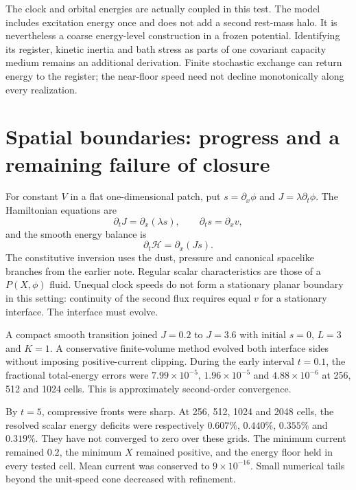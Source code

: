 \documentclass[11pt]{article}
\begin{document}
The clock and orbital energies are actually coupled in this test. The
model includes excitation energy once and does not add a second rest-mass
halo. It is nevertheless a coarse energy-level construction in a frozen
potential. Identifying its register, kinetic inertia and bath stress as
parts of one covariant capacity medium remains an additional derivation.
Finite stochastic exchange can return energy to the register; the
near-floor speed need not decline monotonically along every realization.

\section{Spatial boundaries: progress and a remaining failure of closure}
For constant $V$ in a flat one-dimensional patch, put
$s=\partial_x\phi$ and $J=\lambda\partial_t\phi$. The Hamiltonian equations are
\begin{equation}
 \partial_tJ=\partial_x(\lambda s),\qquad
 \partial_ts=\partial_xv,
\end{equation}
and the smooth energy balance is
\begin{equation}
 \partial_t\mathcal H=\partial_x(Js).
\end{equation}
The constitutive inversion uses the dust, pressure and canonical spacelike
branches from the earlier note. Regular scalar characteristics are those
of a $P(X,\phi)$ fluid\cite{Garriga}. Unequal clock speeds do not form a
stationary planar boundary in this setting: continuity of the second flux
requires equal $v$ for a stationary interface. The interface must evolve.

A compact smooth transition joined $J=0.2$ to $J=3.6$ with initial $s=0$,
$L=3$ and $K=1$. A conservative finite-volume method evolved both interface
sides without imposing positive-current clipping. During the early interval
$t=0.1$, the fractional total-energy errors were
$7.99\times10^{-5}$, $1.96\times10^{-5}$ and $4.88\times10^{-6}$ at
256, 512 and 1024 cells. This is approximately second-order convergence.

By $t=5$, compressive fronts were sharp. At 256, 512, 1024 and 2048 cells,
the resolved scalar energy deficits were respectively $0.607\%$, $0.440\%$,
$0.355\%$ and $0.319\%$. They have not converged to zero over these grids.
The minimum current remained $0.2$, the minimum $X$ remained positive,
and the energy floor held in every tested cell. Mean current was conserved
to $9\times10^{-16}$. Small numerical tails beyond the unit-speed cone
decreased with refinement.
\end{document}
